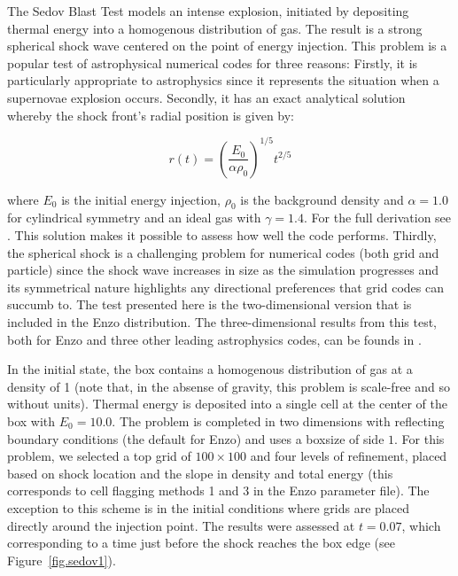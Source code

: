 The Sedov Blast Test \citep{Sedov1959} models an intense explosion, initiated by depositing thermal energy into a homogenous distribution of gas. The result is a strong spherical shock wave centered on the point of energy injection.  This problem is a popular test of astrophysical numerical codes for three reasons: Firstly, it is particularly appropriate to astrophysics since it represents the situation when a supernovae explosion occurs. Secondly, it has an exact analytical solution whereby the shock front's radial position is given by:

\begin{equation}
r(t) = \left(\frac{E_0}{\alpha\rho_0}\right)^{1/5}t^{2/5}
\end{equation}

\noindent where $E_0$ is the initial energy injection, $\rho_0$ is the background density and $\alpha = 1.0$ for cylindrical symmetry and an ideal gas with $\gamma = 1.4$. For the full derivation see \citet{Sedov1959}. This solution makes it possible to assess how well the code performs. Thirdly, the spherical shock is a challenging problem for numerical codes (both grid and particle) since the shock wave increases in size as the simulation progresses and its symmetrical nature highlights any directional preferences that grid codes can succumb to. The test presented here is the two-dimensional version that is included in the Enzo distribution. The three-dimensional results from this test, both for Enzo and three other leading astrophysics codes, can be founds in \citet{Tasker2008}.

In the initial state, the box contains a homogenous distribution of gas at a density of 1 (note that, in the absense of gravity, this problem is scale-free and so without units). Thermal energy is deposited into a single cell at the center of the box with $E_0 = 10.0$. The problem is completed in two dimensions with reflecting boundary conditions (the default for Enzo) and uses a boxsize of side $1$. For this problem, we selected a top grid of $100 \times 100$ and four levels of refinement, placed based on shock location and the slope in density and total energy (this corresponds to cell flagging methods 1 and 3 in the Enzo parameter file). The exception to this scheme is in the initial conditions where grids are placed directly around the injection point. The results were assessed at $t = 0.07$, which corresponding to a time just before the shock reaches the box edge (see Figure~\ref{fig.sedov1}).

